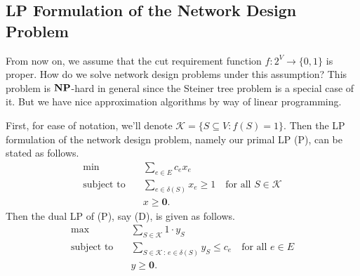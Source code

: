 \subsection{LP Formulation of the Network Design Problem} \label{subsec:7.2}
From now on, we assume that the cut requirement function 
$f : 2^V \to \{0, 1\}$ is proper. How do we solve network design problems 
under this assumption? This problem is $\mathbf{NP}$-hard in general 
since the Steiner tree problem is a special case of it. 
But we have nice approximation algorithms by way of linear programming. 

First, for ease of notation, we'll denote $\mathcal{K} = \{S \subseteq V : 
f(S) = 1\}$. Then the LP formulation of the network design problem, 
namely our primal LP (P), can be stated as follows. 
\begin{align*}
    \min\quad & \sum_{e\in E} c_e x_e \\ 
    \text{subject to}\quad & \sum_{e\in \delta(S)} x_e \geq 1 
    \quad \text{for all $S \in \mathcal{K}$} \\
    & x \geq \mathbf 0.
\end{align*}
Then the dual LP of (P), say (D), is given as follows.
\begin{align*}
    \max\quad & \sum_{S\in\mathcal{K}} 1 \cdot y_S \\ 
    \text{subject to}\quad & \sum_{S\in\mathcal{K}\,:\,e \in \delta(S)} y_S \leq c_e 
    \quad \text{for all $e\in E$} \\
    & y \geq \mathbf 0.
\end{align*}

